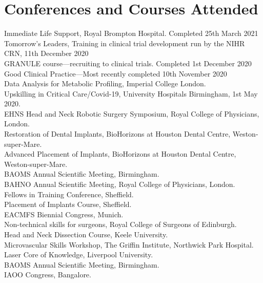 \section*{Conferences and Courses Attended}

 Immediate Life Support, Royal Brompton Hospital. Completed 25th March 2021 \\
 Tomorrow's Leaders, Training in clinical trial development run by the NIHR CRN, 11th December 2020 \\ 
 GRANULE course---recruiting to clinical trials. Completed 1st December 2020 \\
 Good Clinical Practice---Most recently completed 10th November 2020 \\
 Data Analysis for Metabolic Profiling, Imperial College London. \\
 Upskilling in Critical Care/Covid-19, University Hospitals Birmingham, 1st May 2020. \\
 EHNS Head and Neck Robotic Surgery Symposium, Royal College of Physicians, London. \\
 Restoration of Dental Implants, BioHorizons at Houston Dental Centre,  Weston-super-Mare. \\
 Advanced Placement of Implants, BioHorizons at Houston Dental Centre,  Weston-super-Mare. \\
 BAOMS Annual Scientific Meeting, Birmingham. \\
 BAHNO Annual Scientific Meeting, Royal College of Physicians, London. \\
 Fellows in Training Conference,  Sheffield. \\
 Placement of Implants Course, Sheffield. \\
 EACMFS Biennial Congress, Munich. \\
 Non-technical skills for surgeons, Royal College of Surgeons of Edinburgh. \\
 Head and Neck Dissection Course, Keele University. \\
 Microvascular Skills Workshop, The Griffin Institute, Northwick Park Hospital. \\
 Laser Core of Knowledge, Liverpool University. \\
 BAOMS Annual Scientific Meeting, Birmingham. \\
 IAOO Congress, Bangalore. \\
